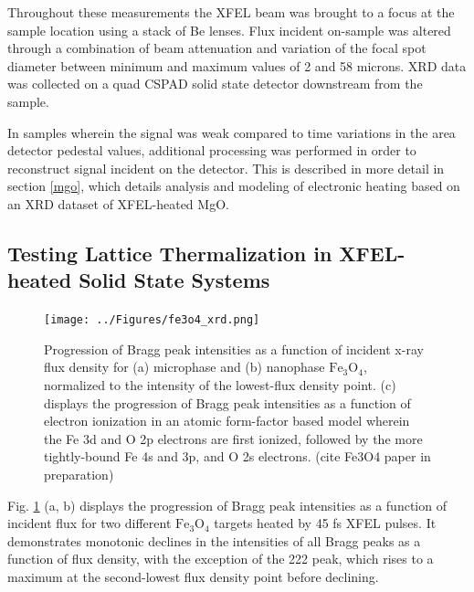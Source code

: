 \documentclass [11pt, proquest, article] {uwthesis}[2016/11/22]
\begin{document}
Throughout these measurements the XFEL beam was brought to a focus at the sample location using a stack of Be lenses. Flux incident on-sample was altered through a combination of beam attenuation and variation of the focal spot diameter between minimum and maximum values of 2 and 58 microns. XRD data was collected on a quad CSPAD solid state detector downstream from the sample.\cite{herrmann2013cspad}

In samples wherein the signal was weak compared to time variations in the area detector pedestal values, additional processing was performed in order to reconstruct signal incident on the detector. 
This is described in more detail in section \ref{mgo}, which details analysis and modeling of electronic heating based on an XRD dataset of XFEL-heated MgO.
 
\subsection{Testing Lattice Thermalization in XFEL-heated Solid State Systems}

\begin{figure}[h] 
	\caption{Progression of Bragg peak intensities as a function of incident x-ray flux density for (a) microphase and (b) nanophase $\mathrm{Fe}_3\mathrm{O}_4$, normalized to the intensity of the lowest-flux density point. (c) displays the progression of Bragg peak intensities as a function of electron ionization in an atomic form-factor based model wherein the Fe 3d and O 2p electrons are first ionized, followed by the more tightly-bound Fe 4s and 3p, and O 2s electrons. (cite Fe3O4 paper in preparation)}
\label{fexrd}
\centering
\texttt{[image: ../Figures/fe3o4\_xrd.png]}
\end{figure}

Fig. \ref{fexrd} (a, b) displays the progression of Bragg peak intensities as a function of incident flux for two different $\mathrm{Fe}_3\mathrm{O}_4$ targets heated by 45 fs XFEL pulses. It demonstrates monotonic declines in the intensities of all Bragg peaks as a function of flux density, with the exception of the 222 peak, which rises to a maximum at the second-lowest flux density point before declining.
\end{document}

